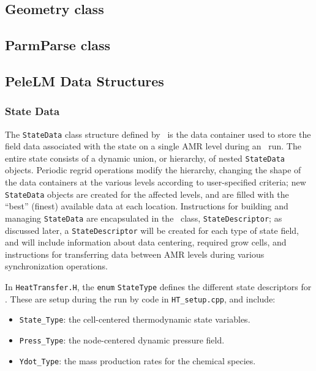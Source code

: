 \subsection{Geometry class}

\subsection{ParmParse class}

\subsection{PeleLM Data Structures}

\subsubsection{State Data}

The {\tt StateData} class structure defined by \amrex\ is the data container
used to store the field data associated with the state on a single AMR level
during an \pelelm\ run.  The entire state consists of a dynamic union, or hierarchy, of
nested {\tt StateData} objects.  Periodic regrid operations modify the hierarchy,
changing the shape of the data containers at the various levels according to
user-specified criteria; new {\tt StateData} objects are created
for the affected levels, and are filled with the ``best'' (finest) available 
data at each location. Instructions for building and managing {\tt StateData} are
encapsulated in the \amrex\ class, {\tt StateDescriptor}; as discussed later,
a {\tt StateDescriptor} will be created for each type of state field, and 
will include information about data centering, required grow cells, and
instructions for transferring data between AMR levels during various synchronization
operations.

In {\tt HeatTransfer.H}, the {\tt enum} {\tt StateType} defines the
different state descriptors for \pelelm.  These are setup during the
run by code in {\tt HT\_setup.cpp}, and include:
\begin{itemize}
\item {\tt State\_Type}: the cell-centered thermodynamic state variables.

\item {\tt Press\_Type}: the node-centered dynamic pressure field.

\item {\tt Ydot\_Type}: the mass production rates for the chemical species.  
  
\end{itemize}

